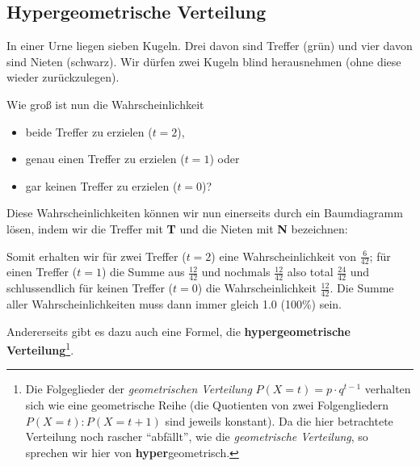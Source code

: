 
\newpage

\subsection{Hypergeometrische Verteilung}
In einer Urne liegen sieben Kugeln. Drei davon sind Treffer (grün) und vier davon sind Nieten (schwarz).
Wir dürfen zwei Kugeln blind herausnehmen (ohne diese wieder zurückzulegen).


Wie groß ist nun die Wahrscheinlichkeit
\begin{itemize}
\item beide Treffer zu erzielen ($t=2$),
\item genau einen Treffer zu erzielen ($t=1$) oder
\item gar keinen Treffer zu erzielen ($t=0$)?
\end{itemize}

Diese Wahrscheinlichkeiten können wir nun einerseits durch ein Baumdiagramm lösen, indem wir die Treffer mit \textbf{\color{green}T} und die Nieten mit \textbf{\color{red}N} bezeichnen:


Somit erhalten wir für zwei Treffer ($t=2$) eine Wahrscheinlichkeit von $\frac{6}{42}$; für einen Treffer ($t=1$) die Summe aus $\frac{12}{42}$ und nochmals $\frac{12}{42}$ also total $\frac{24}{42}$ und schlussendlich für keinen Treffer ($t=0$) die Wahrscheinlichkeit $\frac{12}{42}$.
Die Summe aller Wahrscheinlichkeiten muss dann immer gleich 1.0 (100\%) sein.
\newpage

Andererseits gibt es dazu auch eine Formel, die \textbf{hypergeometrische Verteilung}\footnote{Die Folgeglieder der \textit{geometrischen Verteilung} $P(X=t) = p\cdot{}q^{t-1}$ verhalten sich wie eine geometrische Reihe (die Quotienten von zwei Folgengliedern $P(X=t) : P(X=t+1)$ sind jeweils konstant). Da die hier betrachtete Verteilung noch rascher ``abfällt'', wie die \textit{geometrische Verteilung}, so sprechen wir hier von \textbf{hyper}geometrisch.}.

